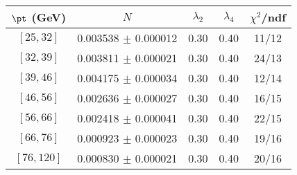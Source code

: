 \begin{tabular}{c||c|c|c|c}
$\pt$ (GeV) & $N$ & $\lambda_{2}$ & $\lambda_4$  & $\chi^2$/ndf  \\
\hline
$[25, 32]$ & 0.003538 $\pm$ 0.000012 & 0.30 & 0.40 & 11/12\\
$[32, 39]$ & 0.003811 $\pm$ 0.000021 & 0.30 & 0.40 & 24/13\\
$[39, 46]$ & 0.004175 $\pm$ 0.000034 & 0.30 & 0.40 & 12/14\\
$[46, 56]$ & 0.002636 $\pm$ 0.000027 & 0.30 & 0.40 & 16/15\\
$[56, 66]$ & 0.002418 $\pm$ 0.000041 & 0.30 & 0.40 & 22/15\\
$[66, 76]$ & 0.000923 $\pm$ 0.000023 & 0.30 & 0.40 & 19/16\\
$[76, 120]$ & 0.000830 $\pm$ 0.000021 & 0.30 & 0.40 & 20/16\\
\end{tabular}
